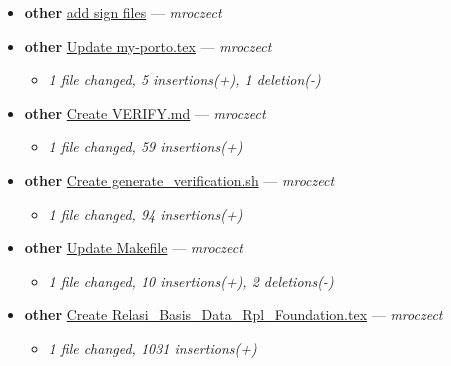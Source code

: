 \begin{itemize}[leftmargin=1.5em]
  \begin{itemize}[leftmargin=1.5em]
    \item \small\textit{1 file changed, 2 insertions(+), 1 deletion(-)}
  \end{itemize}
  \item \textbf{other} \href{https://github.com/mroczect/mroczect.github.io/commit/4057c60e9b263e9484caa5cad6ada4d381916e8b}{add sign files} --- \textit{mroczect}
  \item \textbf{other} \href{https://github.com/mroczect/mroczect.github.io/commit/e95155e8e56a062b03afd8fc9af6439a5bc02226}{Update my-porto.tex} --- \textit{mroczect}
  \begin{itemize}[leftmargin=1.5em]
    \item \small\textit{1 file changed, 5 insertions(+), 1 deletion(-)}
  \end{itemize}
  \item \textbf{other} \href{https://github.com/mroczect/mroczect.github.io/commit/0adb4c71bc2a81e51d103c7ece0f7144f5d90e2e}{Create VERIFY.md} --- \textit{mroczect}
  \begin{itemize}[leftmargin=1.5em]
    \item \small\textit{1 file changed, 59 insertions(+)}
  \end{itemize}
  \item \textbf{other} \href{https://github.com/mroczect/mroczect.github.io/commit/0ae86bdbcad003abd7d319f08a725e36ee3d4af0}{Create generate\_verification.sh} --- \textit{mroczect}
  \begin{itemize}[leftmargin=1.5em]
    \item \small\textit{1 file changed, 94 insertions(+)}
  \end{itemize}
  \item \textbf{other} \href{https://github.com/mroczect/mroczect.github.io/commit/d974d9b4feaf02f76507f5f1a5ea542671615924}{Update Makefile} --- \textit{mroczect}
  \begin{itemize}[leftmargin=1.5em]
    \item \small\textit{1 file changed, 10 insertions(+), 2 deletions(-)}
  \end{itemize}
  \item \textbf{other} \href{https://github.com/mroczect/mroczect.github.io/commit/39fe5d209a194407eca330569c64a64d1c536e2d}{Create Relasi\_Basis\_Data\_Rpl\_Foundation.tex} --- \textit{mroczect}
  \begin{itemize}[leftmargin=1.5em]
    \item \small\textit{1 file changed, 1031 insertions(+)}

\end{itemize}
\end{itemize}
